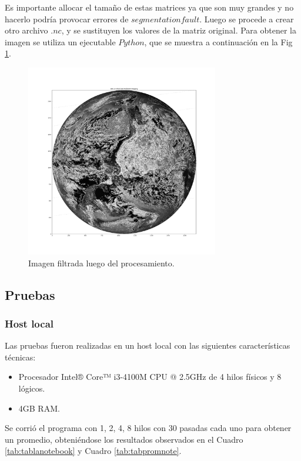 \documentclass[a4paper]{article}
\begin{document}
Es importante allocar el tamaño de estas matrices ya que son muy grandes y no hacerlo podría provocar errores de $segmentation fault$.
Luego se procede a crear otro archivo $.nc$, y se sustituyen los valores de la matriz original. Para obtener la imagen se utiliza un ejecutable $Python$, que se muestra a continuación en la Fig  \ref{fig:imgfiltrada}.

\begin{figure}[H]
	\begin{center}		
	\includegraphics[width=0.75\textwidth]{../imagenFiltrada.png}
  	\caption{Imagen filtrada luego del procesamiento.}
  	\label{fig:imgfiltrada}
  	\end{center}
\end{figure}


\subsection{Pruebas}
\subsubsection{Host local}
Las pruebas fueron realizadas en un host local con las siguientes características técnicas:
\begin{itemize}
\item Procesador Intel® Core™ i3-4100M CPU @ 2.5GHz de 4 hilos físicos y 8 lógicos.
\item 4GB RAM.
\end{itemize}
Se corrió el programa con 1, 2, 4, 8 hilos con 30 pasadas cada uno para obtener un promedio, obteniéndose los resultados observados en el Cuadro \ref{tab:tablanotebook} y Cuadro \ref{tab:tabpromnote}.
\end{document}

